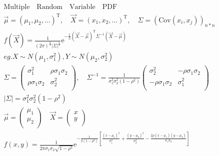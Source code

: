\documentclass{article}
\begin{document}
\begin{align*}
    \mathrm{Multiple \quad Random \quad Variable \quad PDF}\\
    \vec{\mu} = (\mu_{1},\mu_{2},\dots)^{\mathrm{T}}, \quad \vec{X} = (x_{1},x_{2}, \dots)^{\mathrm{T}}, \quad \Sigma = \left(\mathrm{Cov}(x_{i},x_{j})\right)_{n*n}\\
    f(\vec{X}) = \frac{1}{(2\pi)^{\frac{n}{2}}|\Sigma|^{\frac{1}{2}}} \mathrm{e}^{-\frac{1}{2}\left(\vec{X}-\vec{\mu}\right)^{\mathrm{T}} \Sigma^{-1} \left(\vec{X}-\vec{\mu}\right)}\\
    eg. X \sim N(\mu_{1},\sigma_{1}^2), Y \sim N(\mu_{2},\sigma_{2}^2) \\
    \Sigma = \left(
        \begin{array}{cc}
            \sigma_{1}^{2} & \rho \sigma_{1} \sigma_{2}\\
            \rho \sigma_{1} \sigma_{2} & \sigma_{2}^{2}\\ 
        \end{array}
    \right), \quad \Sigma^{-1} = \frac{1}{\sigma_{1}^{2}\sigma_{2}^{2}(1-\rho^2)} 
        \left(
        \begin{array}{cc}
            \sigma_{2}^{2} & -\rho \sigma_{1} \sigma_{2}\\
            -\rho \sigma_{1} \sigma_{2} & \sigma_{1}^{2}\\ 
        \end{array}
        \right) \\ 
        |\Sigma| = \sigma_{1}^{2}\sigma_{2}^{2}(1-\rho^2)\\
    \vec{\mu} = \left(
        \begin{array}{c}
            \mu_{1}\\
            \mu_{2}\\
        \end{array}
    \right) \quad \vec{X} = \left(
        \begin{array}{c}
            x\\
            y\\
        \end{array}
        \right)\\
    f(x,y) = \frac{1}{2\pi \sigma_{1}\sigma_{2}\sqrt{1-\rho^2}} \mathrm{e}^{-\frac{1}{2(1-\rho^2)}\left[\frac{(x-\mu_{1})^2}{\sigma_{1}^2} + \frac{(y-\mu_{2})^2}{\sigma_{2}^2} - \frac{2\rho(x-\mu_{1})(y-\mu_{2})}{\sigma_{1}\sigma_{2}}\right]}\\
\end{align*}
\end{document}
